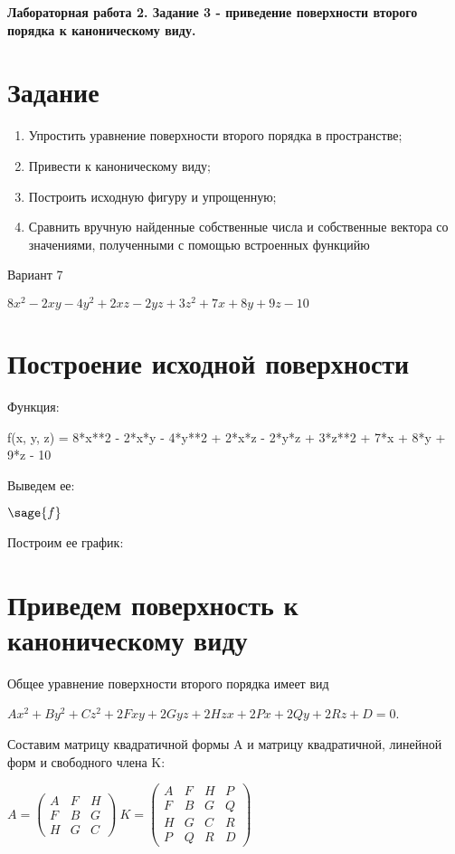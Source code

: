 \documentclass{article}
\begin{document}
\begin{center}
\Large{\textbf{Лабораторная работа 2. Задание 3 - приведение поверхности второго порядка к каноническому виду.}}
\end{center}


\section*{Задание}
\begin{enumerate}
\item Упростить уравнение поверхности второго порядка в пространстве;
\item Привести к каноническому виду;
\item Построить исходную фигуру и упрощенную;
\item Сравнить вручную найденные собственные числа и собственные вектора со значениями, полученными с помощью встроенных функцийю
\end{enumerate}

\begin{center}
Вариант 7

$8x^2 - 2xy - 4y^2 + 2xz - 2yz + 3z^2 + 7x + 8y + 9z - 10$
\end{center}

\section*{Построение исходной поверхности}
Функция:

\begin{sageblock}
f(x, y, z) = 8*x**2 - 2*x*y - 4*y**2 + 2*x*z - 2*y*z + 3*z**2 + 7*x + 8*y + 9*z - 10
\end{sageblock}
Выведем ее:
\begin{center}
$\sage{f}$
\end{center}
Построим ее график:
\begin{center}
\end{center}
\newpage
\section*{Приведем поверхность к каноническому виду}

Общее уравнение поверхности второго порядка имеет вид

$Ax^2 + By^2 + Cz^2 + 2Fxy + 2Gyz + 2Hzx + 2Px + 2Qy + 2Rz + D = 0$.

Составим матрицу квадратичной формы A и матрицу квадратичной, линейной форм и свободного члена K:
\begin{center}

$A =
\begin{pmatrix}
A & F & H\\
F & B & G\\
H & G & C
\end{pmatrix}\
K =
\begin{pmatrix}
A & F & H & P\\
F & B & G & Q\\
H & G & C & R\\
P & Q & R & D
\end{pmatrix}$
\end{center}
\end{document}
